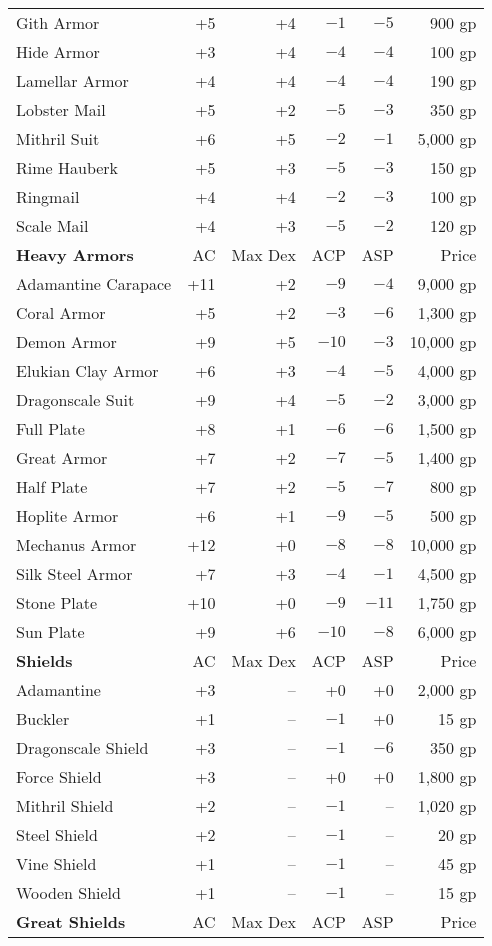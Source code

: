 \begin{center}
\begin{footnotesize}
\begin{tabular}{|lrrrrr|}
Gith Armor&+5&+4&$-1$&$-5$&900 gp\\
Hide Armor&+3&+4&$-4$&$-4$&100 gp\\
Lamellar Armor&+4&+4&$-4$&$-4$&190 gp\\
Lobster Mail&+5&+2&$-5$&$-3$&350 gp\\
Mithril Suit&+6&+5&$-2$&$-1$&5,000 gp\\
Rime Hauberk&+5&+3&$-5$&$-3$&150 gp\\
Ringmail&+4&+4&$-2$&$-3$&100 gp\\
Scale Mail&+4&+3&$-5$&$-2$&120 gp\\\hline
\parbox[c][12pt]{1pt}{}\textbf{Heavy Armors}&AC&Max Dex&ACP&ASP&Price\\\hline
\parbox[c][12pt]{1pt}{}Adamantine Carapace&+11&+2&$-9$&$-4$&9,000 gp\\
Coral Armor&+5&+2&$-3$&$-6$&1,300 gp\\
Demon Armor&+9&+5&$-10$&$-3$&10,000 gp\\
Elukian Clay Armor&+6&+3&$-4$&$-5$&4,000 gp\\
Dragonscale Suit&+9&+4&$-5$&$-2$&3,000 gp\\
Full Plate&+8&+1&$-6$&$-6$&1,500 gp\\
Great Armor&+7&+2&$-7$&$-5$&1,400 gp\\
Half Plate&+7&+2&$-5$&$-7$&800 gp\\
Hoplite Armor&+6&+1&$-9$&$-5$&500 gp\\
Mechanus Armor&+12&+0&$-8$&$-8$&10,000 gp\\
Silk Steel Armor&+7&+3&$-4$&$-1$&4,500 gp\\
Stone Plate&+10&+0&$-9$&$-11$&1,750 gp\\
Sun Plate&+9&+6&$-10$&$-8$&6,000 gp\\\hline
\parbox[c][12pt]{1pt}{}\textbf{Shields}&AC&Max Dex& ACP&ASP&Price\\\hline
\parbox[c][12pt]{1pt}{}Adamantine&+3&--&+0&+0&2,000 gp\\
Buckler&+1&--&$-1$&+0&15 gp\\
Dragonscale Shield&+3&--&$-1$&$-6$&350 gp\\
Force Shield&+3&--&+0&+0&1,800 gp\\
Mithril Shield&+2&--&$-1$&--&1,020 gp\\
Steel Shield&+2&--&$-1$&--&20 gp\\
Vine Shield&+1&--&$-1$&--&45 gp\\
Wooden Shield&+1&--&$-1$&--&15 gp\\\hline
\parbox[c][12pt]{1pt}{}\textbf{Great Shields}&AC&Max Dex&ACP&ASP&Price\\ \hline

\end{tabular}
\end{footnotesize}
\end{center}
